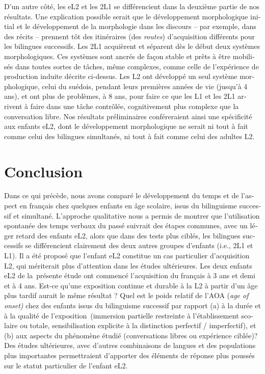 \documentclass[french, output=paper]{langscibook}
\begin{document}
\begin{otherlanguage}{french}
D’un autre côté, les eL2 et les 2L1 se différencient dans la deuxième partie de nos résultats. Une explication possible serait que le développement morphologique initial et le développement de la morphologie dans les discours – par exemple, dans des récits – prennent tôt des itinéraires (des \textit{routes}) d’acquisition différents pour les bilingues successifs. Les 2L1 acquièrent et séparent dès le début deux systèmes morphologiques. Ces systèmes sont ancrés de façon stable et prêts à être mobilisés dans toutes sortes de tâches, même complexes, comme celle de l’expérience de production induite décrite ci-dessus. Les L2 ont développé un seul système morphologique, celui du suédois, pendant leurs premières années de vie (jusqu’à 4 ans), et ont plus de problèmes, à 8 ans, pour faire ce que les L1 et les 2L1 arrivent à faire dans une tâche contrôlée, cognitivement plus complexe que la conversation libre. Nos résultats préliminaires conféreraient ainsi une spécificité aux enfants eL2, dont le développement morphologique ne serait ni tout à fait comme celui des bilingues simultanés, ni tout à fait comme celui des adultes L2.



\section{Conclusion}\label{sec:kilhstedt:7}


Dans ce qui précède, nous avons comparé le développement du temps et de l’aspect en français chez quelques enfants en âge scolaire, issus du bilinguisme successif et simultané. L’approche qualitative nous a permis de montrer que l’utilisation spontanée des temps verbaux du passé suivrait des étapes communes, avec un léger retard des enfants eL2, alors que dans des tests plus ciblés, les bilingues successifs se différencient clairement des deux autres groupes d’enfants (i.e., 2L1 et L1). Il a été proposé que l’enfant eL2 constitue un cas particulier d’acquisition L2, qui mériterait plus d’attention dans les études ultérieures. Les deux enfants eL2 de la~présente étude ont commencé l’acquisition du français à 3 ans et demi et à 4 ans. Est-ce qu’une exposition continue et durable à la L2 à partir d’un âge plus tardif aurait le même résultat ? Quel est le poids relatif de l’AOA (\textit{age of onset)} chez des enfants issus du bilinguisme successif par rapport (a) à la durée et à la qualité de l’exposition~(immersion partielle restreinte à l’établissement scolaire ou totale, sensibilisation explicite à la distinction perfectif / imperfectif), et (b) aux aspects du phénomène étudié (conversations libres ou expérience ciblée)? Des études ultérieures, avec d’autres combinaisons de langues et des populations plus importantes permettraient d’apporter des éléments de réponse plus poussés sur le statut particulier de l’enfant eL2. 


\end{otherlanguage}
\end{document}
